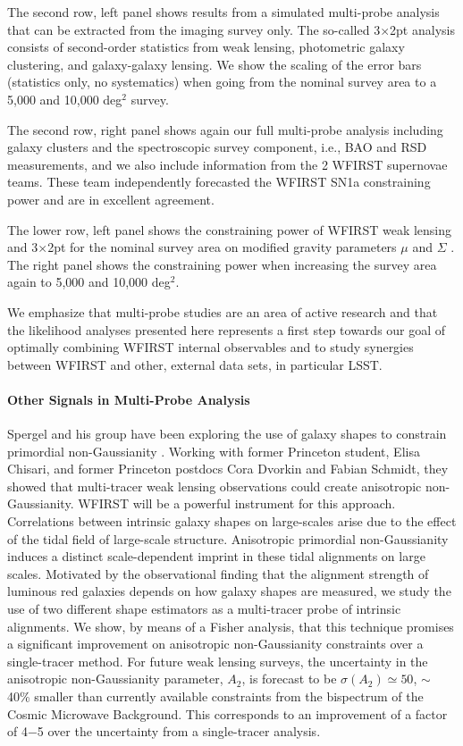 The second row, left panel shows results from a simulated multi-probe analysis
that can be extracted from the imaging survey only. The so-called 3$\times$2pt analysis
consists of second-order statistics from weak lensing, photometric galaxy
clustering, and galaxy-galaxy lensing. We show the scaling of the error bars
(statistics only, no systematics) when going from the nominal survey area to a
5,000 and 10,000 deg$^2$ survey.

The second row, right panel shows again our full multi-probe analysis including
galaxy clusters and the spectroscopic survey component, i.e., BAO and RSD
measurements, and we also include information from the 2 WFIRST supernovae
teams. These team independently forecasted the WFIRST SN1a constraining power
and are in excellent agreement.

The lower row, left panel shows the constraining power of WFIRST weak lensing
and 3$\times$2pt for the nominal survey area on modified gravity parameters $\mu$ and
$\Sigma$ \citep[see e.g.,][for details]{jjk15, baa15}. The right panel shows the
constraining power when increasing the survey area again to 5,000 and 10,000
deg$^2$.

We emphasize that multi-probe studies are an area of active research and that
the likelihood analyses presented here represents a first step towards our goal of optimally combining WFIRST internal observables and to study synergies between WFIRST and other, external data sets, in particular LSST\@.

\paragraph{Other Signals in Multi-Probe Analysis} Spergel and his group have been exploring  the use of galaxy shapes to constrain primordial non-Gaussianity \citep{Chisari:2016xki}. Working with former Princeton student, Elisa Chisari, and former Princeton postdocs Cora Dvorkin and Fabian Schmidt, they showed that
multi-tracer weak lensing observations could create anisotropic non-Gaussianity. WFIRST
will be a powerful instrument for this approach.  Correlations between intrinsic
galaxy shapes on large-scales arise due to the effect of the tidal field of
large-scale structure. Anisotropic primordial non-Gaussianity induces a distinct
scale-dependent imprint in these tidal alignments on large scales. Motivated by
the observational finding that the alignment strength of luminous red galaxies
depends on how galaxy shapes are measured, we study the use of two different
shape estimators as a multi-tracer probe of intrinsic alignments. We show, by
means of a Fisher analysis, that this technique promises a significant
improvement on anisotropic non-Gaussianity constraints over a single-tracer
method. For future weak lensing surveys, the uncertainty in the anisotropic
non-Gaussianity parameter, $A_2$, is forecast to be $\sigma(A_2)\simeq 50$, $\sim$ 40\% smaller than
currently available constraints from the bispectrum of the Cosmic Microwave
Background. This corresponds to an improvement of a factor of 4−5 over the
uncertainty from a single-tracer analysis.

